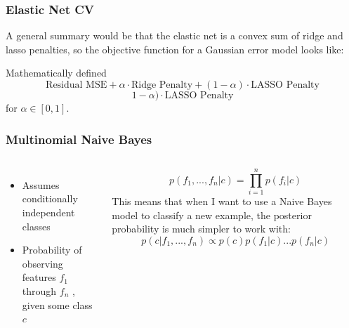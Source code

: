 \documentclass{beamer}
\begin{document}
\begin{frame}
\frametitle{Elastic Net CV}
A general summary would be that the elastic net is a convex sum of ridge and lasso penalties, so the objective function for a Gaussian error model looks like:

\begin{block}{Mathematically defined}
\begin{equation}
\text{Residual MSE}+\alpha \cdot \text{Ridge Penalty}+(1-\alpha)\cdot \text{LASSO Penalty}
\end{equation}
\begin{equation}
1-\alpha)\cdot \text{LASSO Penalty}
\end{equation}
for \(\alpha\in[0,1]\). 
\end{block}
\end{frame}
\begin{frame}
\frametitle{Multinomial Naive Bayes}
\begin{columns}[c] %

\begin{itemize}
\item Assumes conditionally independent classes
\item Probability of observing features \(f_1\)  \\
through \(f_n\) , given some class \(c\)
\end{itemize}

\begin{equation}
p(f_1,..., f_n|c) = \prod_{i=1}^n p(f_i|c)
\end{equation}
This means that when I want to use a Naive Bayes model to classify a new example, the posterior probability is much simpler to work with:
\begin{equation}
p(c|f_1,...,f_n) \propto p(c)p(f_1|c)...p(f_n|c)
\end{equation}
\end{columns}
\end{frame}
\end{document}
